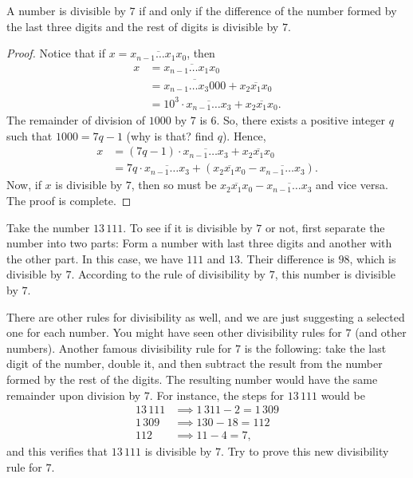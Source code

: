 \documentclass{subfile}
\begin{document}
\begin{proposition}[Divisibility by $7$]\label{prop:divisibility-7}
	A number is divisible by $7$ if and only if the difference of the number formed by the last three digits and the rest of digits is divisible by $7$.
\end{proposition}

\begin{proof}
	Notice that if $x = \overline{x_{n-1} \dots x_1 x_0 }$, then
		\begin{align*}
			x &= \overline{x_{n-1} \dots x_1 x_0 }\\
			  &= \overline{x_{n-1} \dots x_3 000 } +  \overline{x_{2} x_1 x_0 }\\
			  &= 10^3 \cdot \overline{x_{n-1} \dots x_3} +  \overline{x_{2} x_1 x_0 }.
		\end{align*}
	The remainder of division of $1000$ by $7$ is $6$. So, there exists a positive integer $q$ such that $1000 = 7q - 1$ (why is that? find $q$). Hence,
		\begin{align*}
			x &= (7q-1) \cdot \overline{x_{n-1} \dots x_3} +  \overline{x_{2} x_1 x_0 }\\
			  &= 7q \cdot \overline{x_{n-1} \dots x_3} + \left(\overline{x_{2} x_1 x_0 } - \overline{x_{n-1} \dots x_3}\right).
		\end{align*}
	Now, if $x$ is divisible by $7$, then so must be $\overline{x_{2} x_1 x_0 } - \overline{x_{n-1} \dots x_3}$ and vice versa. The proof is complete.
\end{proof}


\begin{example}
	Take the number $13\, 111$. To see if it is divisible by $7$ or not, first separate the number into two parts: Form a number with last three digits and another with the other part. In this case, we have $111$ and $13$. Their difference is $98$, which is divisible by $7$. According to the rule of divisibility by $7$, this number is divisible by $7$.
\end{example}

There are other rules for divisibility as well, and we are just suggesting a selected one for each number. You might have seen other divisibility rules for $7$ (and other numbers). Another famous divisibility rule for $7$ is the following: take the last digit of the number, double it, and then subtract the result from the number formed by the rest of the digits. The resulting number would have the same remainder upon division by $7$. For instance, the steps for $13\, 111$ would be
	\begin{align*}
		13\, 111 & \implies 1\,311 - 2 = 1\, 309\\
		1\, 309  & \implies 130 - 18 = 112\\
		112 &\implies 11 - 4 = 7,
	\end{align*}
and this verifies that $13\, 111$ is divisible by $7$. Try to prove this new divisibility rule for $7$.
\end{document}
